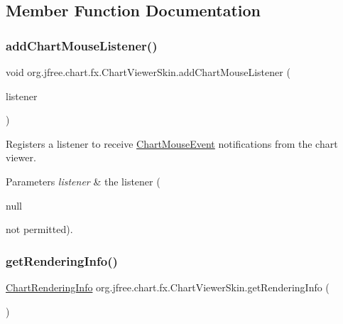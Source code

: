 \subsection{Member Function Documentation}
\mbox{\label{classorg_1_1jfree_1_1chart_1_1fx_1_1_chart_viewer_skin_ac377d76d4ca26d795e1f0983c473d478}} 
\subsubsection{\texorpdfstring{add\+Chart\+Mouse\+Listener()}{addChartMouseListener()}}
{\footnotesize\ttfamily void org.\+jfree.\+chart.\+fx.\+Chart\+Viewer\+Skin.\+add\+Chart\+Mouse\+Listener (\begin{DoxyParamCaption}\item[{\mbox{\hyperlink{interfaceorg_1_1jfree_1_1chart_1_1fx_1_1interaction_1_1_chart_mouse_listener_f_x}{Chart\+Mouse\+Listener\+FX}}}]{listener }\end{DoxyParamCaption})}

Registers a listener to receive \mbox{\hyperlink{classorg_1_1jfree_1_1chart_1_1_chart_mouse_event}{Chart\+Mouse\+Event}} notifications from the chart viewer.


\begin{DoxyParams}{Parameters}
{\em listener} & the listener (
\begin{DoxyCode}
null 
\end{DoxyCode}
 not permitted). \\
\hline
\end{DoxyParams}
\mbox{\label{classorg_1_1jfree_1_1chart_1_1fx_1_1_chart_viewer_skin_a7bc3cbad36d12e3acfb9679776823215}} 
\subsubsection{\texorpdfstring{get\+Rendering\+Info()}{getRenderingInfo()}}
{\footnotesize\ttfamily \mbox{\hyperlink{classorg_1_1jfree_1_1chart_1_1_chart_rendering_info}{Chart\+Rendering\+Info}} org.\+jfree.\+chart.\+fx.\+Chart\+Viewer\+Skin.\+get\+Rendering\+Info (\begin{DoxyParamCaption}{ }\end{DoxyParamCaption})}

